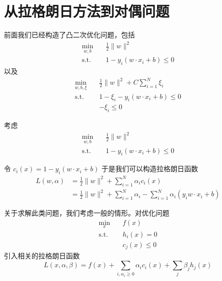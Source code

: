 \section{从拉格朗日方法到对偶问题}

前面我们已经构造了凸二次优化问题，包括
\begin{equation}
\begin{aligned}
\min_{w,b}\quad  & \frac{1}{2}\|w\|^2 \\ 
\text{s.t.} \quad  &  1-y_i \left(w \cdot x_i + b\right) \leqslant 0
\end{aligned}
\end{equation}
以及
\begin{equation}
\begin{aligned}
\min_{w,b,\xi}\quad
                 & \frac12\|w\|^2 + C\sum_{i=1}^N \xi_i \\ 
\text{s.t.}\quad & 1-\xi_i-y_i(w \cdot x_i+b)\le0 \\
                 & -\xi_i\le0
\end{aligned}
\end{equation}

考虑
\begin{equation}
\begin{aligned}
\min_{w,b}\quad  & \frac{1}{2}\|w\|^2 \\ 
\text{s.t.} \quad  &  1-y_i \left(w \cdot x_i + b\right) \leqslant 0
\end{aligned}
\end{equation}

令 $c_i(x) = 1-y_i(w \cdot x_i + b)$
于是我们可以构造拉格朗日函数
\begin{equation}
\begin{aligned}
L(w, \alpha) &= \frac{1}{2} \|w\|^2 + \sum_{i=1}^{N} \alpha_i c_i(x) \\
&=\frac{1}{2} \|w\|^2 +\sum_{i=1}^{N} 
\alpha_i -\sum_{i=1}^{N} \alpha_i\left(y_iw \cdot x_i+b\right)
\end{aligned}
\end{equation}

关于求解此类问题，我们考虑一般的情形。对优化问题
\begin{equation}
\begin{aligned}
\min_{x}\quad& f(x) \\ 
\text{s.t.}\quad &h_i(x) =0\\
                 &c_j(x) \leqslant0
\end{aligned}
\end{equation}
引入相关的拉格朗日函数
\begin{equation}
L(x,\alpha, \beta) = f(x) +
 \sum_{i,\alpha_i \geqslant 0} \alpha_i c_i(x) +
 \sum_{j} \beta_{j} h_j(x) 
\end{equation}

